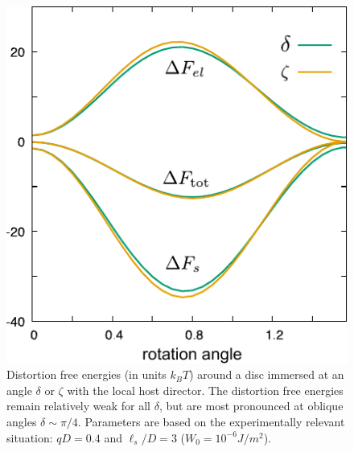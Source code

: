 \begin{figure}
	\includegraphics[width = 0.5 \columnwidth]{figures/chapter-4/discelastic}
	\caption{ Distortion free energies (in units $k_{B}T$) around a disc immersed at an angle $\delta$ or $\zeta$ with the local host director. The distortion free energies remain relatively weak for all $\delta$, but are most pronounced at oblique angles $\delta \sim \pi/4$. Parameters are based on the experimentally relevant situation: $qD =0.4$ and $\ell_{s}/D = 3$ ($W_{0} = 10^{-6} J/m^{2}$). }
	\label{discel}
\end{figure}



